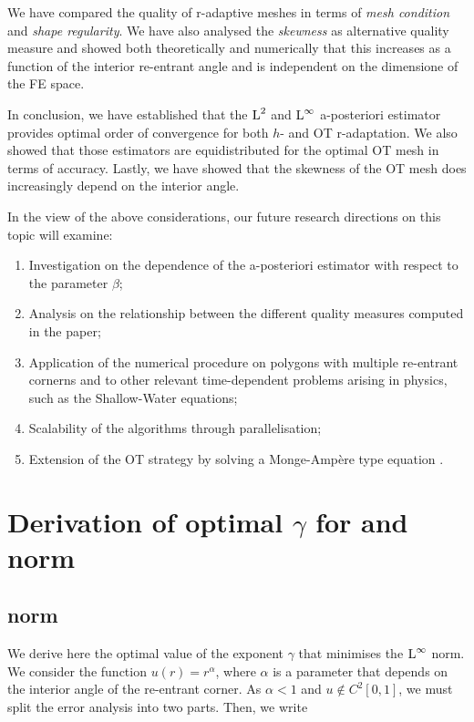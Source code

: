\documentclass[a4paper,11pt]{article}
\begin{document}
{We have compared the quality of r-adaptive meshes in terms of \textit{mesh condition} and \textit{shape regularity}. We have also analysed the \textit{skewness} as alternative quality measure and showed both theoretically and numerically that this increases as a function of the interior re-entrant angle and is independent on the dimensione of the FE space. 

In conclusion, we have established that the $\operatorname L^{2}$ and $\operatorname L^{\infty}$ a-posteriori estimator provides optimal order of convergence for both $h$- and OT r-adaptation. We also showed that those estimators are equidistributed for the optimal OT mesh in terms of accuracy. Lastly, we have showed that the skewness of the OT mesh does increasingly depend on the interior angle.

In the view of the above considerations, our future research directions on this topic will examine:

\begin{enumerate}
\item Investigation on the dependence of the a-posteriori estimator with respect to the parameter $\beta$;
\item Analysis on the relationship between the different quality measures computed in the paper; 
\item Application of the numerical procedure on polygons with multiple re-entrant cornerns and to other relevant time-dependent problems arising in physics, such as the Shallow-Water equations;
\item Scalability of the algorithms through parallelisation;
\item Extension of the OT strategy by solving a Monge-Ampère type equation \cite{BRW:2015}. 
\end{enumerate}


\clearpage
\newpage

\appendix


\section{Derivation of optimal $\gamma$ for \leb{\infty} and  norm}

\subsection{\leb{\infty} norm}

We derive here the optimal value of the exponent $\gamma$ that minimises the $\operatorname L^{\infty}$ norm. We consider the function $u(r) = r^{\alpha}$, where $\alpha$ is a parameter that depends on the interior angle of the re-entrant corner. 
As $\alpha < 1$ and $u \not\in C^{2}[0,1]$, we must split the error analysis into two parts. Then, we write 

}
\end{document}
